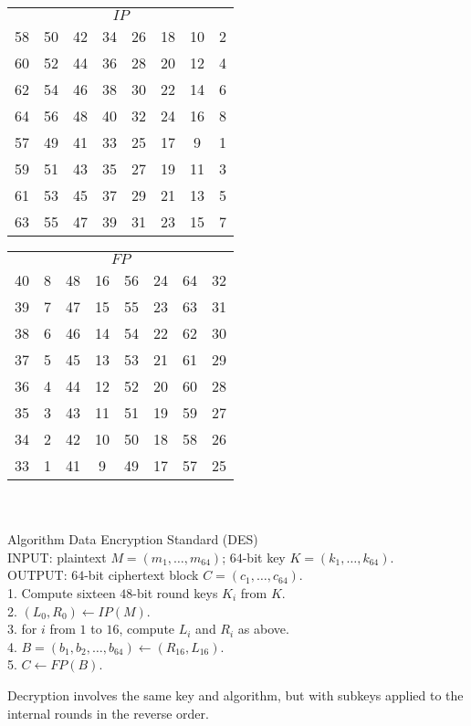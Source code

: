 \documentclass[a4paper, 11pt, openany]{book}
\begin{document}
\begin{tabular}{cccccccc}
\multicolumn{8}{c}{$IP$}\\
58 & 50 & 42 & 34 & 26 & 18 & 10 & 2\\
60 & 52 & 44 & 36 & 28 & 20 & 12 & 4\\
62 & 54 & 46 & 38 & 30 & 22 & 14 & 6\\
64 & 56 & 48 & 40 & 32 & 24 & 16 & 8\\
57 & 49 & 41 & 33 & 25 & 17 & 9 & 1\\
59 & 51 & 43 & 35 & 27 & 19 & 11 & 3\\
61 & 53 & 45 & 37 & 29 & 21 & 13 & 5\\
63 & 55 & 47 & 39 & 31 & 23 & 15 & 7
\end{tabular}
\hfill
\begin{tabular}{cccccccc}
\multicolumn{8}{c}{$FP$}\\
40 & 8 & 48 & 16 & 56 & 24 & 64 & 32\\
39 & 7 & 47 & 15 & 55 & 23 & 63 & 31\\
38 & 6 & 46 & 14 & 54 & 22 & 62 & 30\\
37 & 5 & 45 & 13 & 53 & 21 & 61 & 29\\
36 & 4 & 44 & 12 & 52 & 20 & 60 & 28\\
35 & 3 & 43 & 11 & 51 & 19 & 59 & 27\\
34 & 2 & 42 & 10 & 50 & 18 & 58 & 26\\
33 & 1 & 41 & 9 & 49 & 17 & 57 & 25
\end{tabular}
~\\
~\\
Algorithm Data Encryption Standard (DES)\\
INPUT: plaintext $M = (m_1, \dots, m_{64})$; $64$-bit key $K = (k_1, \dots, k_{64})$.\\
OUTPUT: $64$-bit ciphertext block $C = (c_1, \dots, c_{64})$. \\
1. Compute sixteen $48$-bit round keys $K_i$ from $K$.\\
2. $(L_0, R_0) \gets IP(M)$. \\
3. for $i$ from $1$ to $16$, compute $L_i$ and $R_i$ as above.\\
4. $B = (b_1, b_2, \dots, b_{64}) \gets (R_{16}, L_{16})$. \\
5. $C \gets FP(B)$.


Decryption involves the same key and algorithm, but with subkeys applied to the internal rounds in the reverse order.
\end{document}
